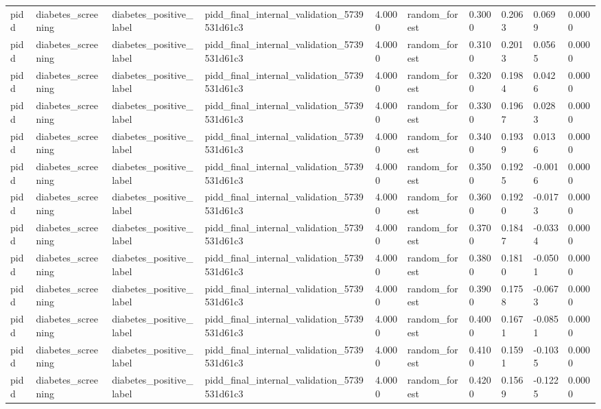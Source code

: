 \begin{tabular}{llllllllll}
pidd & diabetes\_screening & diabetes\_positive\_label & pidd\_final\_internal\_validation\_5739531d61c3 & 4.0000 & random\_forest & 0.3000 & 0.2063 & 0.0699 & 0.0000 \\
pidd & diabetes\_screening & diabetes\_positive\_label & pidd\_final\_internal\_validation\_5739531d61c3 & 4.0000 & random\_forest & 0.3100 & 0.2013 & 0.0565 & 0.0000 \\
pidd & diabetes\_screening & diabetes\_positive\_label & pidd\_final\_internal\_validation\_5739531d61c3 & 4.0000 & random\_forest & 0.3200 & 0.1984 & 0.0426 & 0.0000 \\
pidd & diabetes\_screening & diabetes\_positive\_label & pidd\_final\_internal\_validation\_5739531d61c3 & 4.0000 & random\_forest & 0.3300 & 0.1967 & 0.0283 & 0.0000 \\
pidd & diabetes\_screening & diabetes\_positive\_label & pidd\_final\_internal\_validation\_5739531d61c3 & 4.0000 & random\_forest & 0.3400 & 0.1939 & 0.0136 & 0.0000 \\
pidd & diabetes\_screening & diabetes\_positive\_label & pidd\_final\_internal\_validation\_5739531d61c3 & 4.0000 & random\_forest & 0.3500 & 0.1925 & -0.0016 & 0.0000 \\
pidd & diabetes\_screening & diabetes\_positive\_label & pidd\_final\_internal\_validation\_5739531d61c3 & 4.0000 & random\_forest & 0.3600 & 0.1920 & -0.0173 & 0.0000 \\
pidd & diabetes\_screening & diabetes\_positive\_label & pidd\_final\_internal\_validation\_5739531d61c3 & 4.0000 & random\_forest & 0.3700 & 0.1847 & -0.0334 & 0.0000 \\
pidd & diabetes\_screening & diabetes\_positive\_label & pidd\_final\_internal\_validation\_5739531d61c3 & 4.0000 & random\_forest & 0.3800 & 0.1810 & -0.0501 & 0.0000 \\
pidd & diabetes\_screening & diabetes\_positive\_label & pidd\_final\_internal\_validation\_5739531d61c3 & 4.0000 & random\_forest & 0.3900 & 0.1758 & -0.0673 & 0.0000 \\
pidd & diabetes\_screening & diabetes\_positive\_label & pidd\_final\_internal\_validation\_5739531d61c3 & 4.0000 & random\_forest & 0.4000 & 0.1671 & -0.0851 & 0.0000 \\
pidd & diabetes\_screening & diabetes\_positive\_label & pidd\_final\_internal\_validation\_5739531d61c3 & 4.0000 & random\_forest & 0.4100 & 0.1591 & -0.1035 & 0.0000 \\
pidd & diabetes\_screening & diabetes\_positive\_label & pidd\_final\_internal\_validation\_5739531d61c3 & 4.0000 & random\_forest & 0.4200 & 0.1569 & -0.1225 & 0.0000 \\

\end{tabular}
